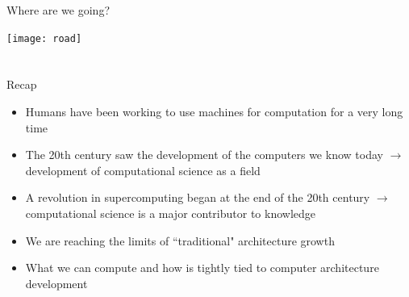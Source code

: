 \documentclass[xcolor=x11names,compress]{beamer}
\renewcommand{\(}{\begin{columns}}
\renewcommand{\)}{\end{columns}}
\newcommand{\<}[1]{\begin{column}{#1}}
\renewcommand{\>}{\end{column}}
\begin{document}
\begin{frame}{Where are we going?}
\begin{center}
\texttt{[image: road]}
\end{center}
\end{frame}

\section*{}
\begin{frame}{Recap}
\begin{itemize}
\item Humans have been working to use machines for computation for a very long time\vspace*{0.5 em}
\item The 20th century saw the development of the computers we know today $\rightarrow$ development of computational science as a field\vspace*{0.5 em}
\item A revolution in supercomputing began at the end of the 20th century $\rightarrow$ \alert{computational science is a major contributor to knowledge}\vspace*{0.5 em}
\item We are reaching the limits of ``traditional" architecture growth\vspace*{0.5 em}
\item What we can compute and how is tightly tied to computer architecture development
\end{itemize}
\end{frame}
\end{document}
